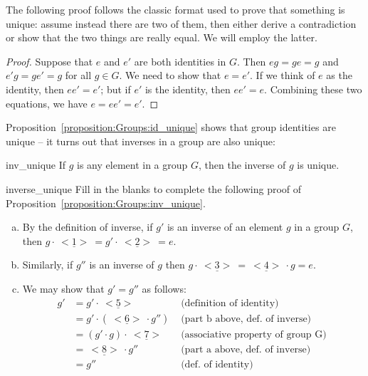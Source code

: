 \begin{rem}
The following proof follows the classic format used to prove that something is unique: assume instead there are two of them, then either derive a contradiction or show that the two things are really equal.  We will employ the latter.
\end{rem}
 
\begin{proof}
Suppose that $e$ and $e'$ are both identities in $G$. Then $eg = ge =
g$ and $e'g = ge' = g$ for all $g \in G$. We need to show that $e =
e'$. If we think of $e$ as the identity, then $ee' = e'$; but if $e'$
is the identity, then $ee' = e$. Combining these two equations, we
have $e = ee' = e'$. 
\end{proof}
 
 Proposition~\ref{proposition:Groups:id_unique} shows that group identities are unique -- it turns out that inverses in a group are also unique:
 
\begin{prop}{inv_unique}
If $g$ is any element in a group $G$, then the inverse of $g$  is unique. 
\end{prop}


\begin{exercise}{inverse_unique}
Fill in the blanks to complete the following proof of Proposition~\ref{proposition:Groups:inv_unique}.
\begin{enumerate}[(a)]
\item
By the definition of inverse, if $g'$ is an inverse of an element $g$ in a group $G$, then 
\noindent
$g \cdot \underline{~<1>~} = g' \cdot \underline{~<2>~} = e$.

\item
Similarly, if $g''$ is an inverse of $g$ then  $g \cdot \underline{~<3>~} = \underline{~<4>~} \cdot g = e$. 
\item
We may show that $g' = g''$ as follows:
\begin{align*}
g' & = g' \cdot \underline{~<5>~}  &\text{ (definition of identity) } \\
    & = g' \cdot (\underline{~<6>~} \cdot g'') &\text{ (part b above, def. of inverse) } \\
    & = (g' \cdot g) \cdot \underline{~<7>~}  &\text{ (associative property of group G) } \\
    & = \underline{~<8>~} \cdot g'' &\text{ (part a above, def. of inverse) } \\
    & = g'' &\text{ (def. of identity) }
\end{align*} 
\end{enumerate}
\end{exercise}

